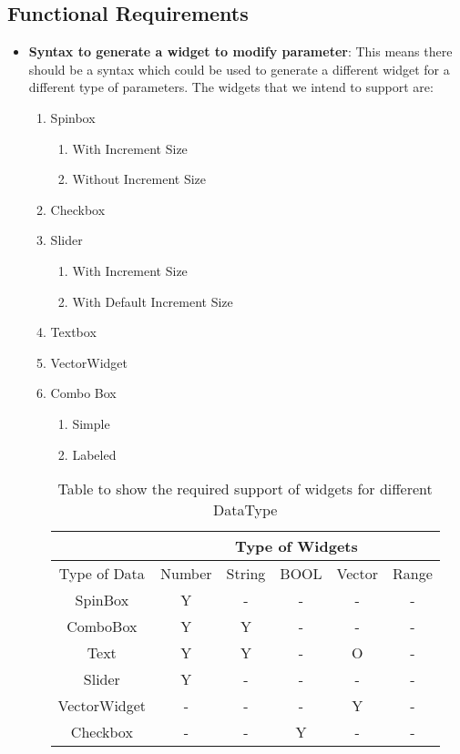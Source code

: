 \subsection{Functional Requirements}
\begin{itemize}
    \item {\bf Syntax to generate a widget to modify parameter}: This means there should be a syntax which could be used to generate a different widget for a different type of parameters.
    The widgets that we intend to support are:
    \begin{enumerate}
        \item Spinbox
            \begin{enumerate}
                \item With Increment Size
                \item Without Increment Size
            \end{enumerate}
        \item Checkbox
        \item Slider
            \begin{enumerate}
                \item With Increment Size
                \item With Default Increment Size
            \end{enumerate}
        \item Textbox
        \item VectorWidget
        \item Combo Box
            \begin{enumerate}
                \item Simple
                \item Labeled
            \end{enumerate}
   
    \begin{table}[h]
        \centering
        \caption{Table to show the required support of widgets for different DataType}
        \begin{tabular}{ |c|c|c|c|c|c| }
            \hline
            & \multicolumn{5}{|c|}{Type of Widgets} \\
            \hline
            Type of Data&    Number&    String&    BOOL &Vector &Range     \\ [0.5ex]
            \hline
            SpinBox&Y&    -&    -&    -&    - \\ \hline
            ComboBox&    Y&    Y&    -&    -&    - \\ \hline
            Text&    Y&    Y&    -&    O&    - \\ \hline
            Slider&    Y&    -&    -&    -&    - \\ \hline
            VectorWidget&    -&    -&    -&    Y&    - \\ \hline
            Checkbox&    -&    -&    Y&    -&    - \\ [1ex]
            \hline
        \end{tabular}
        \label{table2}
    \end{table}
   

\end{enumerate}
\end{itemize}
